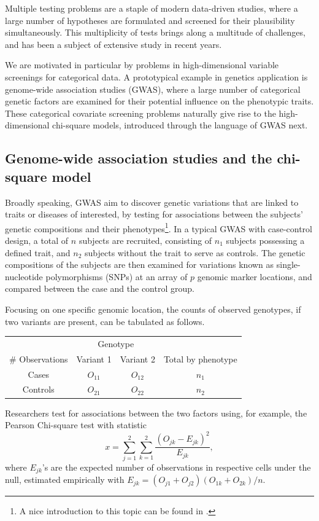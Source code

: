 
Multiple testing problems are a staple of modern data-driven studies, where a large number of hypotheses are formulated and screened for their plausibility simultaneously.
This multiplicity of tests brings along a multitude of challenges, and has been a subject of extensive study in recent years.


We are motivated in particular by problems in high-dimensional variable screenings for categorical data. 
A prototypical example in genetics application is genome-wide association studies (GWAS), where a large number of categorical genetic factors are examined for their potential influence on the phenotypic traits.
These categorical covariate screening problems naturally give rise to the high-dimensional chi-square models, introduced through the language of GWAS next.

\subsection{Genome-wide association studies and the chi-square model}
\label{subsec:motivation-chisq}

Broadly speaking, GWAS aim to discover genetic variations that are linked to traits or diseases of interested, by testing for associations between the subjects' genetic compositions and their phenotypes\footnote{A nice introduction to this topic can be found in \citet{bush2012genome}.}.
In a typical GWAS with case-control design, a total of $n$ subjects are recruited,  consisting of $n_1$ subjects possessing a defined trait, and $n_2$ subjects without the trait to serve as controls.
The genetic compositions of the subjects are then examined for variations known as single-nucleotide polymorphisms (SNPs) at an array of $p$ genomic marker locations, and compared between the case and the control group.

Focusing on one specific genomic location, the counts of observed genotypes, if two variants are present, can be tabulated as follows.
\begin{center}
    \begin{tabular}{cccc}
    \hline
    & \multicolumn{2}{c}{Genotype} & \\
    \cline{2-3}
    \# Observations & Variant 1 & Variant 2 & Total by phenotype \\
    \hline
    Cases & $O_{11}$ & $O_{12}$ & $n_1$ \\
    Controls & $O_{21}$ & $O_{22}$ & $n_2$ \\
    \hline
    \end{tabular}
\end{center}
Researchers test for associations between the two factors using, for example, the Pearson Chi-square test with statistic
\begin{equation} \label{eq:chisq-statistic}
    x = \sum_{j=1}^2 \sum_{k=1}^2 \frac{(O_{jk} - E_{jk})^2}{E_{jk}},
\end{equation}
where $E_{jk}$'s are the expected number of observations in respective cells under the null, estimated empirically with $E_{jk} = (O_{j1}+O_{j2})(O_{1k}+O_{2k})/n$.


